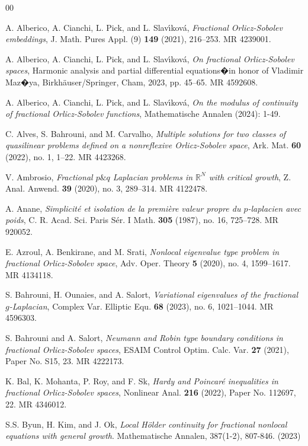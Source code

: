 \documentclass[12pt,reqno]{amsart}
\theoremstyle{definition}
\theoremstyle{remark}
\numberwithin{equation}{section}
\begin{document}
\begin{thebibliography}{00}

A. Alberico, A. Cianchi, L. Pick, and L. Slav\'{\i}kov\'a, \emph{Fractional Orlicz-Sobolev embeddings}, J. Math. Pures Appl. (9) \textbf{149} (2021), 216--253. MR 4239001.

A. Alberico, A. Cianchi, L. Pick, and L. Slav\'{\i}kov\'a, \emph{On fractional Orlicz-Sobolev spaces}, Harmonic analysis and partial differential equations�in honor of Vladimir Maz�ya, Birkh\"{a}user/Springer, Cham,  2023, pp. 45--65. MR 4592608.

A. Alberico, A. Cianchi, L. Pick, and L. Slav\'{\i}kov\'a, \emph{On the modulus of continuity of fractional Orlicz-Sobolev functions}, Mathematische Annalen (2024): 1-49.

C.   Alves, S. Bahrouni, and M.  Carvalho, \emph{Multiple solutions for two classes of quasilinear problems defined on a nonreflexive Orlicz-Sobolev space}, Ark. Mat. \textbf{60} (2022), no. 1, 1--22. MR 4423268.

V. Ambrosio, \emph{Fractional $p\&q$ Laplacian problems in $\mathbb{R}^N$ with critical growth}, Z. Anal. Anwend. \textbf{39} (2020), no. 3, 289--314. MR 4122478.

A. Anane, \emph{Simplicit\'{e} et isolation de la premi\`{e}re valeur propre du $p$-laplacien avec poids}, C. R. Acad. Sci. Paris S\'{e}r. I Math. \textbf{305} (1987), no. 16, 725--728. MR 920052.

E. Azroul, A. Benkirane, and M. Srati, \emph{Nonlocal eigenvalue type problem in fractional Orlicz-Sobolev space}, Adv. Oper. Theory \textbf{5} (2020), no. 4, 1599--1617. MR 4134118.

S. Bahrouni, H. Ounaies, and A. Salort, \emph{Variational eigenvalues of the fractional $g$-Laplacian}, Complex Var. Elliptic Equ. \textbf{68} (2023), no. 6, 1021--1044. MR 4596303.

S. Bahrouni and A. Salort, \emph{Neumann and Robin type boundary conditions in fractional Orlicz-Sobolev spaces}, ESAIM Control Optim. Calc. Var. \textbf{27} (2021), Paper No. S15, 23. MR 4222173.

K. Bal, K. Mohanta, P. Roy, and F. Sk, \emph{Hardy and Poincar\'{e} inequalities in fractional Orlicz-Sobolev spaces}, Nonlinear Anal. \textbf{216} (2022), Paper No. 112697, 22. MR 4346012.

S.S. Byun,  H. Kim, and J. Ok, \emph{Local H\"older continuity for fractional nonlocal equations with general growth}. Mathematische Annalen, 387(1-2), 807-846. (2023)




\end{thebibliography}
\end{document}
